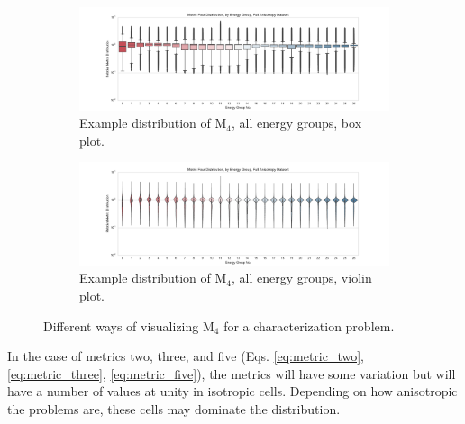 \begin{figure}[htb]\ContinuedFloat
  \centering
  \begin{subfigure}[t]{\textwidth}
    \includegraphics[width=\linewidth]{./chapters/characterization_probs/figures/sample_data/metric_four_box_full.pdf}
    \caption{Example distribution of M$_4$, all energy groups, box plot.}
    \label{fig:sampleboxM4}
  \end{subfigure}
  \begin{subfigure}[t]{\textwidth}
    \includegraphics[width=\linewidth]{./chapters/characterization_probs/figures/sample_data/metric_four_violin_full.pdf}
    \caption{Example distribution of M$_4$, all energy groups, violin plot.}
    \label{fig:sampleviolinM4}
  \end{subfigure}
  \caption[Different ways of visualizing M$_4$ for a characterization problem.]
  {Different ways of visualizing M$_4$ for a characterization problem.}
  \label{fig:samplestrips}
\end{figure}

In the case of metrics two,
three, and five (Eqs. \eqref{eq:metric_two}, \eqref{eq:metric_three},
\eqref{eq:metric_five}), the metrics will have some variation but will have a
number of values at unity in isotropic cells. Depending on how anisotropic the
problems are, these cells may dominate the distribution.

